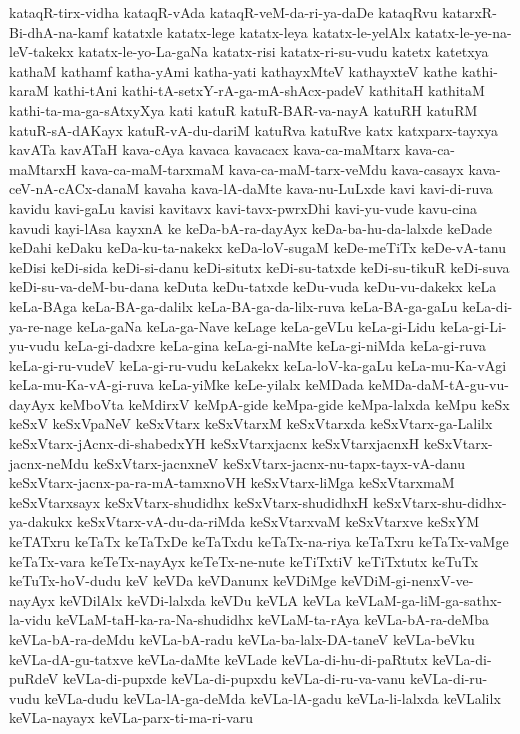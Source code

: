 {kataqR-tirx-vidha
kataqR-vAda
kataqR-veM-da-ri-ya-daDe
kataqRvu
katarxR-Bi-dhA-na-kamf
katatxle
katatx-lege
katatx-leya
katatx-le-yelAlx
katatx-le-ye-na-leV-takekx
katatx-le-yo-La-gaNa
katatx-risi
katatx-ri-su-vudu
katetx
katetxya
kathaM
kathamf
katha-yAmi
katha-yati
kathayxMteV
kathayxteV
kathe
kathi-karaM
kathi-tAni
kathi-tA-setxY-rA-ga-mA-shAcx-padeV
kathitaH
kathitaM
kathi-ta-ma-ga-sAtxyXya
kati
katuR
katuR-BAR-va-nayA
katuRH
katuRM
katuR-sA-dAKayx
katuR-vA-du-dariM
katuRva
katuRve
katx
katxparx-tayxya
kavATa
kavATaH
kava-cAya
kavaca
kavacacx
kava-ca-maMtarx
kava-ca-maMtarxH
kava-ca-maM-tarxmaM
kava-ca-maM-tarx-veMdu
kava-casayx
kava-ceV-nA-cACx-danaM
kavaha
kava-lA-daMte
kava-nu-LuLxde
kavi
kavi-di-ruva
kavidu
kavi-gaLu
kavisi
kavitavx
kavi-tavx-pwrxDhi
kavi-yu-vude
kavu-cina
kavudi
kayi-lAsa
kayxnA
ke
keDa-bA-ra-dayAyx
keDa-ba-hu-da-lalxde
keDade
keDahi
keDaku
keDa-ku-ta-nakekx
keDa-loV-sugaM
keDe-meTiTx
keDe-vA-tanu
keDisi
keDi-sida
keDi-si-danu
keDi-situtx
keDi-su-tatxde
keDi-su-tikuR
keDi-suva
keDi-su-va-deM-bu-dana
keDuta
keDu-tatxde
keDu-vuda
keDu-vu-dakekx
keLa
keLa-BAga
keLa-BA-ga-dalilx
keLa-BA-ga-da-lilx-ruva
keLa-BA-ga-gaLu
keLa-di-ya-re-nage
keLa-gaNa
keLa-ga-Nave
keLage
keLa-geVLu
keLa-gi-Lidu
keLa-gi-Li-yu-vudu
keLa-gi-dadxre
keLa-gina
keLa-gi-naMte
keLa-gi-niMda
keLa-gi-ruva
keLa-gi-ru-vudeV
keLa-gi-ru-vudu
keLakekx
keLa-loV-ka-gaLu
keLa-mu-Ka-vAgi
keLa-mu-Ka-vA-gi-ruva
keLa-yiMke
keLe-yilalx
keMDada
keMDa-daM-tA-gu-vu-dayAyx
keMboVta
keMdirxV
keMpA-gide
keMpa-gide
keMpa-lalxda
keMpu
keSx
keSxV
keSxVpaNeV
keSxVtarx
keSxVtarxM
keSxVtarxda
keSxVtarx-ga-Lalilx
keSxVtarx-jAcnx-di-shabedxYH
keSxVtarxjacnx
keSxVtarxjacnxH
keSxVtarx-jacnx-neMdu
keSxVtarx-jacnxneV
keSxVtarx-jacnx-nu-tapx-tayx-vA-danu
keSxVtarx-jacnx-pa-ra-mA-tamxnoVH
keSxVtarx-liMga
keSxVtarxmaM
keSxVtarxsayx
keSxVtarx-shudidhx
keSxVtarx-shudidhxH
keSxVtarx-shu-didhx-ya-dakukx
keSxVtarx-vA-du-da-riMda
keSxVtarxvaM
keSxVtarxve
keSxYM
keTATxru
keTaTx
keTaTxDe
keTaTxdu
keTaTx-na-riya
keTaTxru
keTaTx-vaMge
keTaTx-vara
keTeTx-nayAyx
keTeTx-ne-nute
keTiTxtiV
keTiTxtutx
keTuTx
keTuTx-hoV-dudu
keV
keVDa
keVDanunx
keVDiMge
keVDiM-gi-nenxV-ve-nayAyx
keVDilAlx
keVDi-lalxda
keVDu
keVLA
keVLa
keVLaM-ga-liM-ga-sathx-la-vidu
keVLaM-taH-ka-ra-Na-shudidhx
keVLaM-ta-rAya
keVLa-bA-ra-deMba
keVLa-bA-ra-deMdu
keVLa-bA-radu
keVLa-ba-lalx-DA-taneV
keVLa-beVku
keVLa-dA-gu-tatxve
keVLa-daMte
keVLade
keVLa-di-hu-di-paRtutx
keVLa-di-puRdeV
keVLa-di-pupxde
keVLa-di-pupxdu
keVLa-di-ru-va-vanu
keVLa-di-ru-vudu
keVLa-dudu
keVLa-lA-ga-deMda
keVLa-lA-gadu
keVLa-li-lalxda
keVLalilx
keVLa-nayayx
keVLa-parx-ti-ma-ri-varu
}
